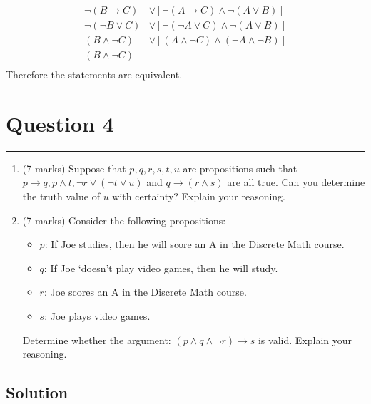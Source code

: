 \documentclass{article}
\begin{document}
\begin{enumerate}[label=\alph*.]
\begin{enumerate}[label=\roman*.]
\[\begin{aligned}
                            \neg(B \to C)       & \lor [\neg(A \to C) \land \neg(A \lor B)]           \\
                            \neg(\neg B \lor C) & \lor [\neg(\neg A \lor C) \land \neg(A \lor B)]     \\
                            (B \land \neg C)    & \lor [(A \land \neg C) \land (\neg A \land \neg B)] \\
                            (B \land \neg C)                                                          \\
                        \end{aligned}\]
                    Therefore the statements are equivalent.
          \end{enumerate}
\end{enumerate}



\section*{Question 4}
\hrule
\vspace{0.5cm}

\begin{enumerate}[label=\alph*.]
    \item (7 marks) Suppose that \( p, q, r, s, t, u \) are propositions such that \( p \to q, p \land t, \neg r \lor (\neg t \lor u) \) and \( q \to (r \land s) \) are all true. Can you determine the truth value of \( u \) with certainty? Explain your reasoning.
    \item (7 marks) Consider the following propositions:
          \begin{itemize}
              \item \( p \): If Joe studies, then he will score an A in the Discrete Math course.
              \item \( q \): If Joe `doesn’t play video games, then he will study.
              \item \( r \): Joe scores an A in the Discrete Math course.
              \item \( s \): Joe plays video games.
          \end{itemize}
          Determine whether the argument: \( (p \land q \land \neg r) \to s \) is valid. Explain your reasoning.
\end{enumerate}

\subsection*{Solution}
\end{document}
